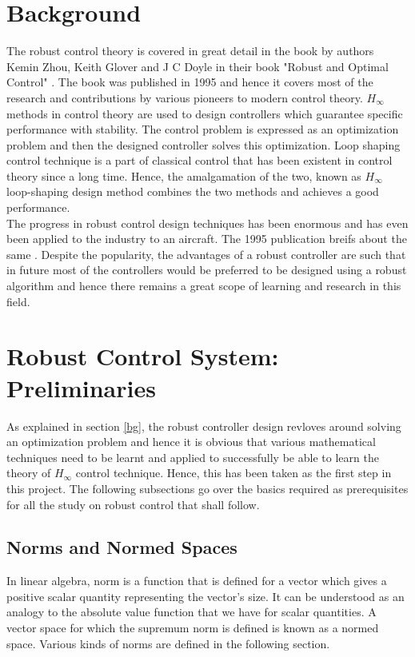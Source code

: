 \documentclass[a4paper,12pt]{article}
\begin{document}
\section{Background}
The robust control theory is covered in great detail in the book by authors Kemin Zhou, Keith Glover and J C Doyle in their book "Robust and Optimal Control" \cite{book}. The book was published in 1995 and hence it covers most of the research and contributions by various pioneers to modern control theory. $H_{\infty}$ methods in control theory are used to design controllers which guarantee specific performance with stability. The control problem is expressed as an optimization problem and then the designed controller solves this optimization. Loop shaping control technique is a part of classical control that has been existent in control theory since a long time. Hence, the amalgamation of the two, known as $H_{\infty}$ loop-shaping design method combines the two methods and achieves a good performance. \\
The progress in robust control design techniques has been enormous and has even been applied to the industry to an aircraft. The 1995 publication breifs about the same \cite{aero}. Despite the popularity, the advantages of a robust controller are such that in future most of the controllers would be preferred to be designed using a robust algorithm and hence there remains a great scope of learning and research in this field. \\
\label{bg}
\section{Robust Control System: Preliminaries}

As explained in section \ref{bg}, the robust controller design revloves around solving an optimization problem and hence it is obvious that various mathematical techniques need to be learnt and applied to successfully be able to learn the theory of $H_{\infty}$ control technique. Hence, this has been taken as the first step in this project. The following subsections go over the basics required as prerequisites for all the study on robust control that shall follow. 
	\subsection{Norms and Normed Spaces}
	In linear algebra, norm is a function that is defined for a vector which gives a positive scalar quantity representing the vector's size. It can be understood as an analogy to the absolute value function that we have for scalar quantities. A vector space for which the supremum norm is defined is known as a normed space. Various kinds of norms are defined in the following section.
\end{document}
